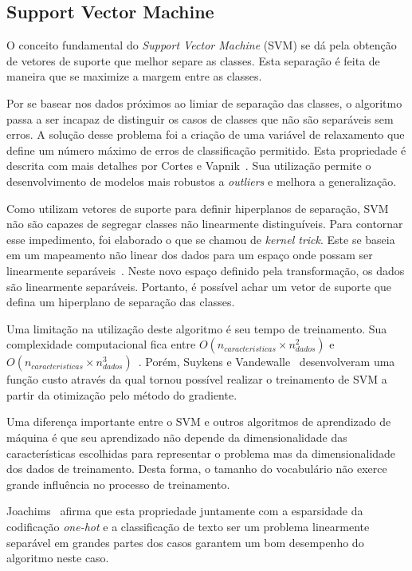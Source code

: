 
\subsection{Support Vector Machine}

O conceito fundamental do \textit{Support Vector Machine} (SVM) se dá pela obtenção de vetores de suporte que melhor
separe as classes.
Esta separação é feita de maneira que se maximize a margem entre as classes.

Por se basear nos dados próximos ao limiar de separação das classes, o algoritmo passa a ser incapaz de distinguir os
casos de classes que não são separáveis sem erros.
A solução desse problema foi a criação de uma variável de relaxamento que define um número máximo de erros de
classificação permitido.
Esta propriedade é descrita com mais detalhes por Cortes e Vapnik~\cite{cortes95}.
Sua utilização permite o desenvolvimento de modelos mais robustos a \textit{outliers} e melhora a generalização.

Como utilizam vetores de suporte para definir hiperplanos de separação, SVM não são capazes de segregar classes não
linearmente distinguíveis.
Para contornar esse impedimento, foi elaborado o que se chamou de \textit{kernel trick}.
Este se baseia em um mapeamento não linear dos dados para um espaço onde possam ser linearmente
separáveis~\cite{scholkopf02}.
Neste novo espaço definido pela transformação, os dados são linearmente separáveis.
Portanto, é possível achar um vetor de suporte que defina um hiperplano de separação das classes.

Uma limitação na utilização deste algoritmo é seu tempo de treinamento. Sua complexidade computacional fica entre
$O(n_{caracteristicas} \times n_{dados}^2)$ e $O(n_{caracteristicas} \times n_{dados}^3)$~\cite{list09}.
Porém, Suykens e Vandewalle~\cite{suykens99} desenvolveram uma função custo através da qual tornou possível realizar o treinamento de SVM
a partir da otimização pelo método do gradiente.

Uma diferença importante entre o SVM e outros algoritmos de aprendizado de máquina é que seu aprendizado não depende
da dimensionalidade das características escolhidas para representar o problema mas da dimensionalidade dos dados de
treinamento.
Desta forma, o tamanho do vocabulário não exerce grande influência no processo de treinamento.

Joachims~\cite{joachims98} afirma que esta propriedade juntamente com a esparsidade da codificação \textit{one-hot}
e a classificação de texto ser um problema linearmente separável em grandes partes dos casos garantem um bom desempenho
do algoritmo neste caso.

